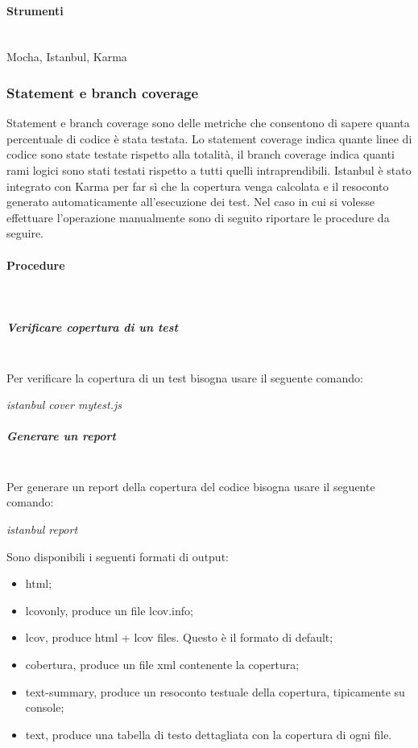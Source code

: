 \paragraph{Strumenti} \hfill \\
Mocha, Istanbul, Karma


\subsubsection{Statement e branch coverage}
Statement e branch coverage sono delle metriche che consentono di sapere quanta percentuale di codice è stata testata.
Lo statement coverage indica quante linee di codice sono state testate rispetto alla totalità, il branch coverage indica quanti rami logici sono stati testati rispetto a tutti quelli intraprendibili.
Istanbul è stato integrato con Karma per far sì che la copertura venga calcolata e il resoconto generato automaticamente all'esecuzione dei test.
Nel caso in cui si volesse effettuare l'operazione manualmente sono di seguito riportare le procedure da seguire.
\paragraph{Procedure} \hfill \\
\subparagraph{Verificare copertura di un test} \hfill \\
Per verificare la copertura di un test bisogna usare il seguente comando:\\
\begin{center}
\textit{istanbul cover mytest.js}\\
\end{center}

\subparagraph{Generare un report} \hfill \\
Per generare un report della copertura del codice bisogna usare il seguente comando:\\

\begin{center}
\textit{istanbul report}\\
\end{center}
Sono disponibili i seguenti formati di output:
\begin{itemize}
\item html;
\item lcovonly, produce un file lcov.info;
\item lcov, produce html + lcov files. Questo è il formato di default;
\item cobertura, produce un file xml contenente la copertura;
\item text-summary, produce un resoconto testuale della copertura, tipicamente su console;
\item text, produce una tabella di testo dettagliata con la copertura di ogni file.
\end{itemize}

